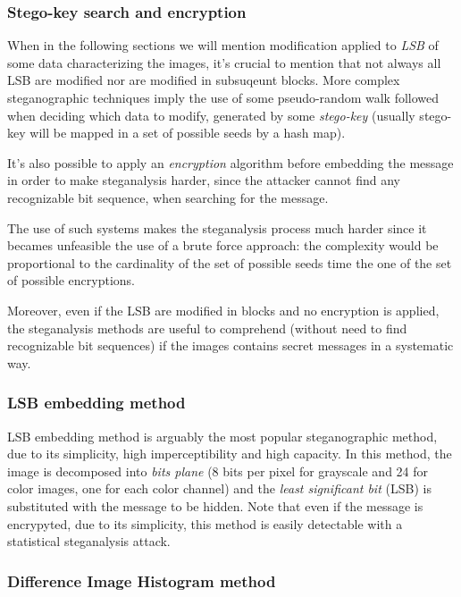 \documentclass[../../main.tex]{subfiles}
\begin{document}
    \subsubsection{Stego-key search and encryption}
    When in the following sections we will mention modification applied to
    \emph{LSB} of some data characterizing the images, it's crucial to mention
    that not always all LSB are modified nor are modified in subsuqeunt blocks.
    More complex steganographic techniques imply the use of some pseudo-random
    walk followed when deciding which data to modify, generated by some
    \emph{stego-key} (usually stego-key will be mapped in a set of possible
    seeds by a hash map).

    It's also possible to apply an \emph{encryption} algorithm before embedding
    the message in order to make steganalysis harder, since the attacker cannot
    find any recognizable bit sequence, when searching for the message.

    The use of such systems makes the steganalysis process much harder since it
    becames unfeasible the use of a brute force approach: the complexity would
    be proportional to the cardinality of the set of possible seeds time the
    one of the set of possible encryptions.

    Moreover, even if the LSB are modified in blocks and no encryption is
    applied, the steganalysis methods are useful to comprehend (without need to
    find recognizable bit sequences) if the images contains secret messages in
    a systematic way.


    \subsubsection{LSB embedding method}
    LSB embedding method is arguably the most popular steganographic method, due
    to its simplicity, high imperceptibility and high capacity.
    In this method, the image is decomposed into \emph{bits plane} (8 bits per
    pixel for grayscale and 24 for color images, one for each color channel)
    and the \emph{least significant bit} (LSB) is substituted with the message
    to be hidden.
    Note that even if the message is encrypyted, due to its simplicity, this
    method is easily detectable with a statistical steganalysis attack.
    

    \subsubsection{Difference Image Histogram method}
\end{document}
